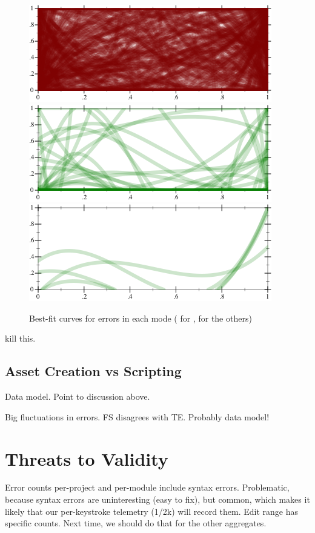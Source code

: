 \documentclass[english,submission,cleveref]{programming}
\begin{document}
\begin{figure}[t]
  \includegraphics[width=0.8\columnwidth]{img/fit-nocheck-Force-3.pdf}
  \includegraphics[width=0.8\columnwidth]{img/fit-nonstrict-TypeE-3.pdf}
  \includegraphics[width=0.8\columnwidth]{img/fit-strict-TypeE-3.pdf}
  \caption{Best-fit curves for errors in each mode ( for \mnocheck{},  for the others)}
  \label{f:scribbles}
\end{figure}

 kill this.

\subsection{Asset Creation vs Scripting}

Data model. Point to discussion above.

Big fluctuations in errors.
FS disagrees with TE.
Probably data model!


\section{Threats to Validity}
\label{s:threats}

Error counts per-project and per-module include syntax errors.
Problematic, because syntax errors are uninteresting (easy to fix),
but common, which makes it likely that our per-keystroke telemetry (1/2k) will record them.
Edit range has specific counts.
Next time, we should do that for the other aggregates.
\end{document}

